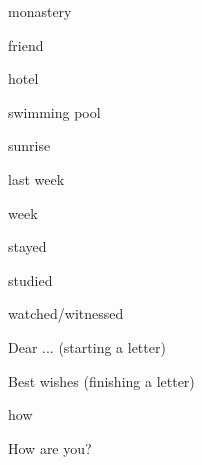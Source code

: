\documentclass[avery5371,grid,frame]{flashcards}
\begin{document}
\begin{flashcard}{\LARGE monastery}
\LARGE {}
\end{flashcard}
\begin{flashcard}{\LARGE friend}
\LARGE {}
\end{flashcard}
\begin{flashcard}{\LARGE hotel}
\LARGE {}
\end{flashcard}
\begin{flashcard}{\LARGE swimming pool}
\LARGE {}
\end{flashcard}
\begin{flashcard}{\LARGE sunrise}
\LARGE {}
\end{flashcard}
\begin{flashcard}{\LARGE last week}
\LARGE {}
\end{flashcard}
\begin{flashcard}{\LARGE week}
\LARGE {}
\end{flashcard}
\begin{flashcard}{\LARGE stayed}
\LARGE {}
\end{flashcard}
\begin{flashcard}{\LARGE studied}
\LARGE {}
\end{flashcard}
\begin{flashcard}{\LARGE watched/witnessed}
\LARGE {}
\end{flashcard}
\begin{flashcard}{\LARGE Dear ... (starting a letter)}
\LARGE {}
\end{flashcard}
\begin{flashcard}{\LARGE Best wishes (finishing a letter)}
\LARGE {}
\end{flashcard}
\begin{flashcard}{\LARGE how}
\LARGE {}
\end{flashcard}
\begin{flashcard}{\LARGE How are you?}
\LARGE {}
\end{flashcard}
\end{document}
